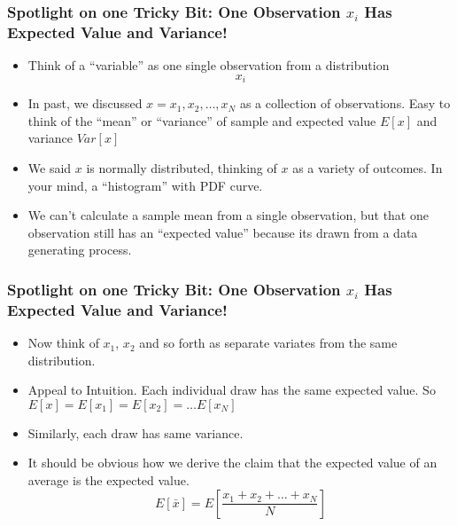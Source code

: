 \documentclass[10pt,english]{beamer}
\begin{document}
\begin{frame}
  \frametitle{Spotlight on one Tricky Bit: One Observation $x_i$ Has Expected Value and
    Variance!}
  \begin{itemize}
  \item Think of a ``variable'' as one single observation from a distribution
    \begin{equation}
      x_i
    \end{equation}
  \item In past, we discussed $x={x_1,x_2,\ldots,x_N}$ as a collection
    of observations. Easy to think of the ``mean'' or ``variance'' of
    sample and expected value $E[x]$ and variance $Var[x]$
  \item We said $x$ is normally distributed, thinking of $x$ as a
    variety of outcomes. In your mind, a ``histogram'' with PDF curve.
    \item We can't calculate a sample mean from a single observation,
      but that one observation still has an ``expected value'' because
      its drawn from a data generating process.
  \end{itemize}
\end{frame}


\begin{frame}
  \frametitle{Spotlight on one Tricky Bit: One Observation $x_i$ Has Expected Value and
    Variance!}
  \begin{itemize}
  \item Now think of $x_1$, $x_2$ and so forth as separate variates
    from the same distribution.
  \item Appeal to Intuition. Each individual draw has the same
    expected value. So $E[x] = E[x_1] = E[x_2]= \ldots E[x_N]$
  \item Similarly, each draw has same variance.
  \item It should be obvious how we derive the claim that the expected
    value of an average is the expected value.
    \begin{displaymath}
      E[\bar{x}] = E[\frac{x_1 + x_2 + \ldots + x_N}{N}]
    \end{displaymath}

  \end{itemize}
\end{frame}
\end{document}
